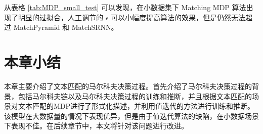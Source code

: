 从表格 \ref{tab:MDP_small_test} 可以发现，在小数据集下 Matching MDP 算法出现了明显的过拟合，人工调节的 $\epsilon$ 可以小幅度提高算法的效果，但是仍然无法超过 MatchPyramid 和 MatchSRNN。

\section{本章小结}
本章主要介绍了文本匹配的马尔科夫决策过程。首先介绍了马尔科夫决策过程的背景，包括马尔科夫链以及马尔科夫决策过程的训练和推断，并且根据文本匹配的场景对文本匹配的MDP进行了形式化描述，并利用值迭代的方法进行训练和推断。该模型在大数据量的情况下表现优异，但是由于值迭代算法的缺陷，在小数据场景下表现不佳。在后续章节中，本文将针对该问题进行改进。
